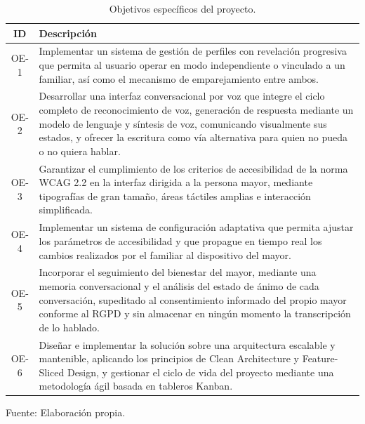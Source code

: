 \begin{table}[H]
    \centering
    \caption{Objetivos específicos del proyecto.}
    \label{tab:objetivos}
    \begin{tabularx}{\textwidth}{@{}c >{\RaggedRight\arraybackslash}X@{}}
        \toprule
        \textbf{ID} & \textbf{Descripción} \\
        \midrule
        OE-1 & Implementar un sistema de gestión de perfiles con revelación progresiva que permita al usuario
        operar en modo independiente o vinculado a un familiar, así como el mecanismo de emparejamiento entre
        ambos. \\
        \addlinespace
        OE-2 & Desarrollar una interfaz conversacional por voz que integre el ciclo completo de reconocimiento
        de voz, generación de respuesta mediante un modelo de lenguaje y síntesis de voz, comunicando
        visualmente sus estados, y ofrecer la escritura como vía alternativa para quien no pueda o no quiera
        hablar. \\
        \addlinespace
        OE-3 & Garantizar el cumplimiento de los criterios de accesibilidad de la norma WCAG 2.2
        \citep{wcag} en la interfaz dirigida a la persona mayor, mediante tipografías de gran tamaño, áreas
        táctiles amplias e interacción simplificada. \\
        \addlinespace
        OE-4 & Implementar un sistema de configuración adaptativa que permita ajustar los parámetros de
        accesibilidad y que propague en tiempo real los cambios realizados por el familiar al dispositivo del
        mayor. \\
        \addlinespace
        OE-5 & Incorporar el seguimiento del bienestar del mayor, mediante una memoria conversacional y el
        análisis del estado de ánimo de cada conversación, supeditado al consentimiento informado del propio
        mayor conforme al RGPD \citep{RGPD2016} y sin almacenar en ningún momento la transcripción de lo
        hablado. \\
        \addlinespace
        OE-6 & Diseñar e implementar la solución sobre una arquitectura escalable y mantenible, aplicando los
        principios de Clean Architecture y Feature-Sliced Design, y gestionar el ciclo de vida del proyecto
        mediante una metodología ágil basada en tableros Kanban. \\
        \bottomrule
    \end{tabularx}

    \vspace{2pt}
    {\footnotesize Fuente: Elaboración propia.}
\end{table}

